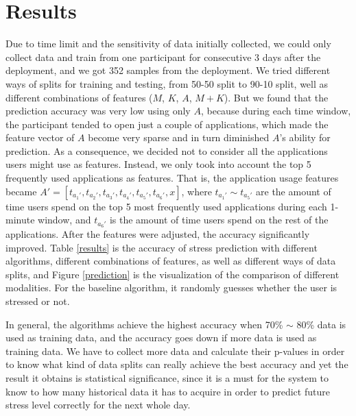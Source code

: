 \documentclass{article}
\begin{document}
\section{Results}
Due to time limit and the sensitivity of data initially collected, we could only collect data and train from one participant for consecutive 3 days after the deployment, and we got 352 samples from the deployment. We tried different ways of splits for training and testing, from 50-50 split to 90-10 split,  well as different combinations of features ($M$, $K$, $A$, $M+K$). But we found that the prediction accuracy was very low using only $A$, because during each time window, the participant tended to open just a couple of applications, which made the feature vector of $A$ become very sparse and in turn diminished $A$'s ability for prediction. As a consequence, we decided not to consider all the applications users might use as features. Instead, we only took into account the top 5 frequently used applications as features. That is, the application usage features became $A'=[t_{a_1'}, t_{a_2'}, t_{a_3'}, t_{a_4'}, t_{a_5'}, t_{a_6'}, x]$, where $t_{a_1'}\sim t_{a_5'}$ are the amount of time users spend on the top 5 most frequently used applications during each 1-minute window, and $t_{a_6'}$ is the amount of time users spend on the rest of the applications. After the features were adjusted, the accuracy significantly improved. Table \ref{results} is the accuracy of stress prediction with different algorithms, different combinations of features, as well as different ways of data splits, and Figure \ref{prediction} is the visualization of the comparison of different modalities.  For the baseline algorithm, it randomly guesses whether the user is stressed or not.

In general, the algorithms achieve the highest accuracy when 70\% $\sim$ 80\% data is used as training data, and the accuracy goes down if more data is used as training data. We have to collect more data and calculate their p-values in order to know what kind of data splits can really achieve the best accuracy and yet the result it obtains is statistical significance, since it is a must for the system to know to how many historical data it has to acquire in order to predict future stress level correctly for the next whole day. 
\end{document}
